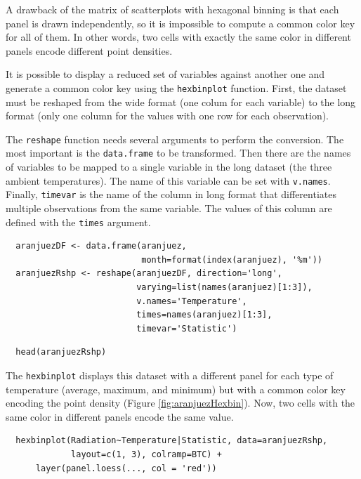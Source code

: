 \documentclass[smallroyalvopaper]{memoir}
\begin{document}
A drawback of the matrix of scatterplots with hexagonal binning is
that each panel is drawn independently, so it is impossible to compute
a common color key for all of them. In other words, two cells with
exactly the same color in different panels encode different point
densities.

It is possible to display a reduced set of variables against
another one and generate a common color key using the \texttt{hexbinplot}
function. First, the dataset must be reshaped from the wide format
(one colum for each variable) to the long format (only one column for
the values with one row for each observation). 

The \texttt{reshape} function needs several arguments to perform the
conversion. The most important is the \texttt{data.frame} to be
transformed. Then there are the names of variables to be mapped to
a single variable in the long dataset (the three ambient
temperatures). The name of this variable can be set with
\texttt{v.names}. Finally, \texttt{timevar} is the name of the column in long format that
differentiates multiple observations from the same variable. The
values of this column are defined with the \texttt{times} argument.


\lstset{language=r,label= ,caption= ,captionpos=b,numbers=none}
\begin{lstlisting}
  aranjuezDF <- data.frame(aranjuez,
                           month=format(index(aranjuez), '%m'))
  aranjuezRshp <- reshape(aranjuezDF, direction='long',
                          varying=list(names(aranjuez)[1:3]),
                          v.names='Temperature',
                          times=names(aranjuez)[1:3],
                          timevar='Statistic')
\end{lstlisting}


\lstset{language=r,label= ,caption= ,captionpos=b,numbers=none}
\begin{lstlisting}
  head(aranjuezRshp)
\end{lstlisting}

The \texttt{hexbinplot} displays this dataset with a different panel for
each type of temperature (average, maximum, and minimum) but with a
common color key encoding the point density (Figure
\ref{fig:aranjuezHexbin}). Now, two cells with the same color in
different panels encode the same value. 

\lstset{language=r,label= ,caption= ,captionpos=b,numbers=none}
\begin{lstlisting}
  hexbinplot(Radiation~Temperature|Statistic, data=aranjuezRshp,
             layout=c(1, 3), colramp=BTC) +
      layer(panel.loess(..., col = 'red'))
\end{lstlisting}
\end{document}
